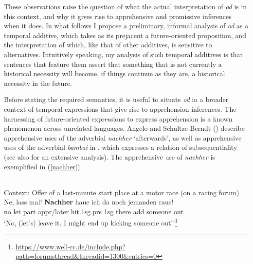 \documentclass[output=paper,colorlinks,citecolor=brown]{langscibook}
\begin{document}
These observations raise the question of what the actual interpretation of \textit{od} is in this context, and why it gives rise to apprehensive and promissive inferences when it does. In  what follows I propose a preliminary, informal analysis of \textit{od} as a temporal additive, which takes as its prejacent a future-oriented proposition, and the interpretation of which, like that of other additives, is sensitive to alternatives. Intuitively speaking, my analysis of such temporal additives is that sentences that feature them assert that something that is not currently a historical necessity will become, if things continue as they are, a historical necessity in the future. 

Before stating the required semantics, it is useful to situate \textit{od} in a broader context of temporal expressions that give rise to apprehension inferences. The harnessing of future-oriented expressions to express apprehension is a known phenomenon across unrelated languages.
Angelo and Schultze-Berndt (\citeyear{angelo-berndt16, angelo-berndt18}) describe apprehensive uses of the  adverbial \textit{nachher} `afterwards', as well as apprehensive uses of the adverbial \textit{bambai} in , which expresses a relation of subsequentiality (see also \citealt{phillips18, phillips2021} for an extensive analysis). The apprehensive use of \textit{nachher} is exemplified in (\ref{nachher}).

\ea
\label{nachher}  \\
\textnormal{Context: Offer of a last-minute start place at a motor race (on a racing forum)} \\
\gll Ne, lass mal! \textbf{Nachher} haue ich da noch jemanden raus! \\
no let {\sc part} {\sc appr}/later hit.{\sc 1sg.prs} {\sc 1sg} there {\sc add} someone out \\

\glt `No, (let's) leave	it.	I might	end	up kicking someone out!'\footnote{\url{https://www.well-rc.de/include.php?path=forumsthread&threadid=1300&entries=0}}
\z
\end{document}
